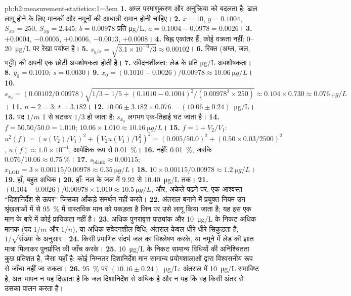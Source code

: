 \begin{solution}{pb:b2:measurement-statistics:1}\emergencystretch=3em
\textbf{1.} अम्ल परमाणुकरण और अनुक्रिया को बदलता है; ढाल लागू होने के लिए मानकों और नमूनों की
आधात्री समान होनी चाहिए।
\textbf{2.} $\bar x = 10$, $\bar y = 0.1004$, $S_{xx} = 250$, $S_{xy} = 2.445$: $b = 0.00978$ प्रति
\unit{\micro g/L}, $a = 0.1004 - 0.0978 = 0.0026$।
\textbf{3.} $+0.0004$, $-0.0005$, $+0.0006$, $-0.0013$, $+0.0008$।
\textbf{4.} चिह्न एकांतर हैं, कोई वक्रता नहीं: 0--\qty{20}{\micro g/L} पर रेखा पर्याप्त है।
\textbf{5.} $s_{y/x} = \sqrt{3.1 \times 10^{-6}/3} \approx 0.00102$।
\textbf{6.} रिक्त (अम्ल, जल, भट्टी) की अपनी एक छोटी अवशोषकता होती है।
\textbf{7.} संवेदनशीलता: लेड के प्रति \unit{\micro g/L} अवशोषकता।
\textbf{8.} $\bar y_0 = 0.1010$; $s = 0.0030$।
\textbf{9.} $x_0 = (0.1010 - 0.0026)/0.00978 \approx \qty{10.06}{\micro g/L}$।
\textbf{10.} $s_{x_0} = (0.00102/0.00978)\sqrt{1/3 + 1/5 + (0.1010 - 0.1004)^2/(0.00978^2 \times 250)}
\approx 0.104 \times 0.730 \approx \qty{0.076}{\micro g/L}$।
\textbf{11.} $n - 2 = 3$; $t = 3.182$।
\textbf{12.} $10.06 \pm 3.182 \times 0.076 = (10.06 \pm 0.24)$~\unit{\micro g/L}।
\textbf{13.} पद $1/m$ 1 से घटकर $1/3$ हो जाता है: $s_{x_0}$ लगभग एक-तिहाई घट जाता है।
\textbf{14.} $f = 50.50/50.0 = 1.010$; $10.06 \times 1.010 \approx \qty{10.16}{\micro g/L}$।
\textbf{15.} $f = 1 + V_2/V_1$: $u^2(f) = (u(V_2)/V_1)^2 + (V_2u(V_1)/V_1^2)^2 = (0.005/50.0)^2 +
(0.50 \times 0.03/2500)^2$, $u(f) \approx 1.0 \times 10^{-4}$, आपेक्षिक रूप से 0.01~\%।
\textbf{16.} नहीं: 0.01~\%, जबकि $0.076/10.06 \approx 0.75~\%$।
\textbf{17.} $s_{\mathrm{blank}} \approx 0.00115$; $x_{\mathrm{LOD}} = 3 \times 0.00115/0.00978 \approx
\qty{0.35}{\micro g/L}$।
\textbf{18.} $10 \times 0.00115/0.00978 \approx \qty{1.2}{\micro g/L}$।
\textbf{19.} हाँ, बहुत अधिक।
\textbf{20.} हाँ: नल के जल में 9.92 से \qty{10.40}{\micro g/L} तक।
\textbf{21.} $(0.104 - 0.0026)/0.00978 \times 1.010 \approx \qty{10.5}{\micro g/L}$, और, अकेले पढ़ने पर,
एक आश्वस्त ``दिशानिर्देश से ऊपर'' जिसका आँकड़े समर्थन नहीं करते।
\textbf{22.} अंतराल बनाने में प्रयुक्त नियम उन श्रृंखलाओं में से 95~\% में वास्तविक मान को पकड़ता है जिन पर
उसे लागू किया जाता है; यह इस एक मान के बारे में कोई प्रायिकता नहीं है।
\textbf{23.} अधिक पुनरावृत्त पाठ्यांक और \qty{10}{\micro g/L} के निकट अधिक मानक (पद $1/m$ और
$1/n$), या अधिक संवेदनशील विधि; अंतराल केवल धीरे-धीरे सिकुड़ता है, $1/\sqrt{\text{संख्या}}$ के अनुसार।
\textbf{24.} किसी प्रमाणित संदर्भ जल का विश्लेषण करके, या नमूने में लेड की ज्ञात मात्रा मिलाकर
पुनर्प्राप्ति की जाँच करके।
\textbf{25.} \qty{10}{\micro g/L} के निकट सामान्य विधियों की अनिश्चितता कुछ प्रतिशत है, जैसा यहाँ है: कोई
निम्नतर दिशानिर्देश मान सामान्य प्रयोगशालाओं द्वारा विश्वसनीय रूप से जाँचा नहीं जा सकता।
\textbf{26.} 95~\% पर $\boldsymbol{(10.16 \pm 0.24)}$~\unit{\micro g/L}: अंतराल में
\qty{10}{\micro g/L} समाविष्ट है, अतः मापन न यह दिखाता है कि जल दिशानिर्देश से अधिक है और न यह कि वह
किसी अंतर से उसका पालन करता है।
\end{solution}
